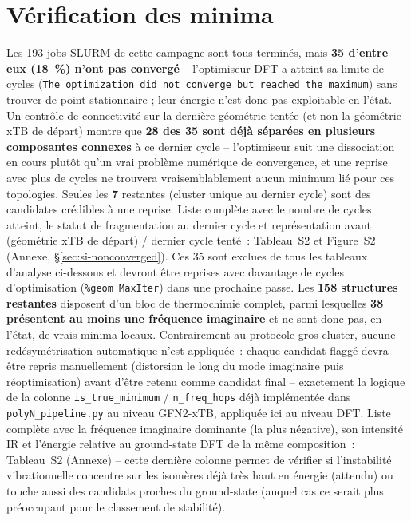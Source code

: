 \documentclass[11pt,a4paper]{article}
\begin{document}
\section{V\'erification des minima}
\label{sec:minima}

Les 193 jobs SLURM de cette campagne sont tous termin\'es, mais
\textbf{35 d'entre eux (18~\%) n'ont pas convergé} -- l'optimiseur DFT a
atteint sa limite de cycles (\texttt{The optimization did not converge
but reached the maximum}) sans trouver de point stationnaire ; leur
\'energie n'est donc pas exploitable en l'\'etat. Un contr\^ole de
connectivit\'e sur la derni\`ere g\'eom\'etrie tent\'ee (et non la
g\'eom\'etrie xTB de d\'epart) montre que \textbf{28 des 35 sont d\'ej\`a
s\'epar\'ees en plusieurs composantes connexes} \`a ce dernier cycle --
l'optimiseur suit une dissociation en cours plut\^ot qu'un vrai probl\`eme
num\'erique de convergence, et une reprise avec plus de cycles ne
trouvera vraisemblablement aucun minimum li\'e pour ces topologies.
Seules les \textbf{7} restantes (cluster unique au dernier cycle) sont
des candidates cr\'edibles \`a une reprise. Liste compl\`ete avec le
nombre de cycles atteint, le statut de fragmentation au dernier cycle et
repr\'esentation avant (g\'eom\'etrie xTB de d\'epart) / dernier cycle
tent\'e~: Tableau~S2 et Figure~S2 (Annexe, \S\ref{sec:si-nonconverged}).
Ces 35 sont exclues de
tous les tableaux d'analyse ci-dessous et devront \^etre reprises avec
davantage de cycles d'optimisation (\texttt{\%geom MaxIter}) dans une
prochaine passe. Les \textbf{158 structures restantes} disposent d'un
bloc de thermochimie complet, parmi lesquelles \textbf{38 pr\'esentent
au moins une fr\'equence imaginaire} et ne sont donc pas, en l'\'etat, de
vrais minima locaux. Contrairement au protocole
gros-cluster, aucune red\'esym\'etrisation automatique n'est appliqu\'ee~:
chaque candidat flagg\'e devra \^etre repris manuellement (distorsion le
long du mode imaginaire puis r\'eoptimisation) avant d'\^etre retenu comme
candidat final -- exactement la logique de la colonne
\texttt{is\_true\_minimum} / \texttt{n\_freq\_hops} d\'ej\`a impl\'ement\'ee
dans \texttt{polyN\_pipeline.py} au niveau GFN2-xTB, appliqu\'ee ici au
niveau DFT. Liste compl\`ete avec la fr\'equence imaginaire dominante
(la plus n\'egative), son intensit\'e IR et l'\'energie relative au
ground-state DFT de la m\^eme composition~: Tableau~S2 (Annexe) -- cette
derni\`ere colonne permet de v\'erifier si l'instabilit\'e vibrationnelle
concentre sur les isom\`eres d\'ej\`a tr\`es haut en \'energie (attendu)
ou touche aussi des candidats proches du ground-state (auquel cas ce
serait plus pr\'eoccupant pour le classement de stabilit\'e).
\end{document}
